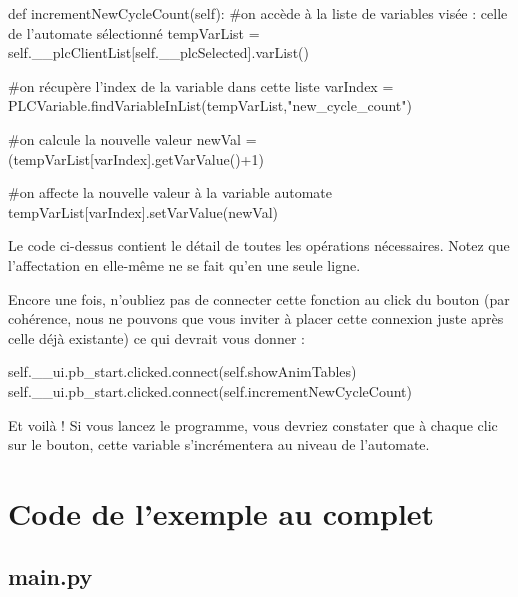 \documentclass[12pt]{report}    %
\begin{document}
\begin{pyCode}
def incrementNewCycleCount(self):
	#on accède à la liste de variables visée : celle de l'automate sélectionné
	tempVarList = self.__plcClientList[self.__plcSelected].varList()

	#on récupère l'index de la variable dans cette liste
	varIndex = PLCVariable.findVariableInList(tempVarList,"new_cycle_count")

	#on calcule la nouvelle valeur
	newVal = (tempVarList[varIndex].getVarValue()+1)%

	#on affecte la nouvelle valeur à la variable automate
	tempVarList[varIndex].setVarValue(newVal)
\end{pyCode}
Le code ci-dessus contient le détail de toutes les opérations nécessaires.\newline
Notez que l'affectation en elle-même ne se fait qu'en une seule ligne.\smallSkip

Encore une fois, n'oubliez pas de connecter cette fonction au click du bouton (par cohérence, nous ne pouvons que vous inviter à placer cette connexion juste après celle déjà existante) ce qui devrait vous donner :
\begin{pyCode}
self.__ui.pb_start.clicked.connect(self.showAnimTables)
self.__ui.pb_start.clicked.connect(self.incrementNewCycleCount)
\end{pyCode}
\smallSkip

Et voilà ! Si vous lancez le programme, vous devriez constater que à chaque clic sur le bouton, cette variable s'incrémentera au niveau de l'automate.


\chapter{Code de l'exemple au complet}


\newpage
\section{main.py}
\end{document}
